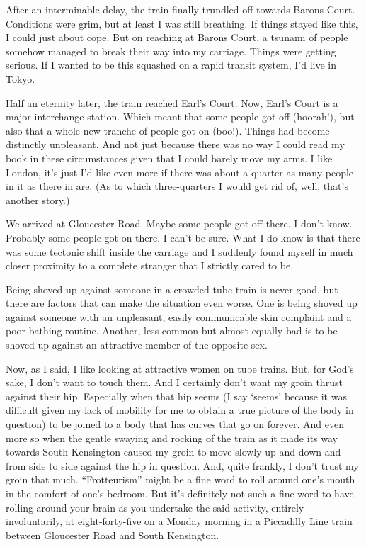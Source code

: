 After an interminable delay, the train finally trundled off towards
Barons Court. Conditions were grim, but at least I was still
breathing. If things stayed like this, I could just about cope. But
on reaching at Barons Court, a tsunami of people somehow managed to
break their way into my carriage. Things were getting serious. If I
wanted to be this squashed on a rapid transit system, I'd live in
Tokyo.

Half an eternity later, the train reached Earl's Court. Now, Earl's
Court is a major interchange station. Which meant that some people
got off (hoorah!), but also that a whole new tranche of people got
on (boo!). Things had become distinctly unpleasant. And not just
because there was no way I could read my book in these circumstances
given that I could barely move my arms. I like London, it's just I'd
like even more if there was about a quarter as many people in it as
there in are. (As to which three-quarters I would get rid of, well,
that's another story.)

We arrived at Gloucester Road. Maybe some people got off there. I
don't know. Probably some people got on there. I can't be sure. What
I do know is that there was some tectonic shift inside the carriage
and I suddenly found myself in much closer proximity to a complete
stranger that I strictly cared to be.

Being shoved up against someone in a crowded tube train is never
good, but there are factors that can make the situation even worse.
One is being shoved up against someone with an unpleasant, easily
communicable skin complaint and a poor bathing routine. Another,
less common but almost equally bad is to be shoved up against an
attractive member of the opposite sex.

Now, as I said, I like looking at attractive women on tube trains.
But, for God's sake, I don't want to touch them. And I certainly
don't want my groin thrust against their hip. Especially when that
hip seems (I say `seems' because it was difficult given my lack of
mobility for me to obtain a true picture of the body in question) to be
joined to a body that has curves that go on forever. And even more
so when the gentle swaying and rocking of the train as it made its
way towards South Kensington caused my groin to move slowly up and
down and from side to side against the hip in question. And, quite
frankly, I don't trust my groin that much. ``Frotteurism'' might be
a fine word to roll around one's mouth in the comfort of one's
bedroom. But it's definitely not such a fine word to have rolling
around your brain as you undertake the said activity, entirely
involuntarily, at eight-forty-five on a Monday morning in a
Piccadilly Line train between Gloucester Road and South Kensington.

